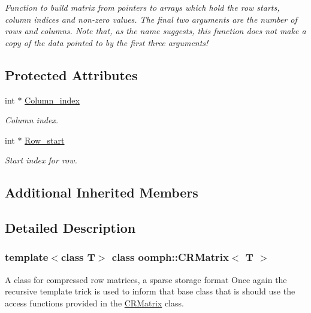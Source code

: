 \begin{DoxyCompactItemize}
\begin{DoxyCompactList}\small\item\em Function to build matrix from pointers to arrays which hold the row starts, column indices and non-\/zero values. The final two arguments are the number of rows and columns. Note that, as the name suggests, this function does not make a copy of the data pointed to by the first three arguments! \end{DoxyCompactList}\end{DoxyCompactItemize}
\subsection*{Protected Attributes}
\begin{DoxyCompactItemize}
\item 
int $\ast$ \hyperlink{classoomph_1_1CRMatrix_a713740a548e1b022b4153145c465a2c3}{Column\+\_\+index}
\begin{DoxyCompactList}\small\item\em Column index. \end{DoxyCompactList}\item 
int $\ast$ \hyperlink{classoomph_1_1CRMatrix_a6d2a0db8650e65c9278febe27feeb22e}{Row\+\_\+start}
\begin{DoxyCompactList}\small\item\em Start index for row. \end{DoxyCompactList}\end{DoxyCompactItemize}
\subsection*{Additional Inherited Members}


\subsection{Detailed Description}
\subsubsection*{template$<$class T$>$\newline
class oomph\+::\+C\+R\+Matrix$<$ T $>$}

A class for compressed row matrices, a sparse storage format Once again the recursive template trick is used to inform that base class that is should use the access functions provided in the \hyperlink{classoomph_1_1CRMatrix}{C\+R\+Matrix} class. 

